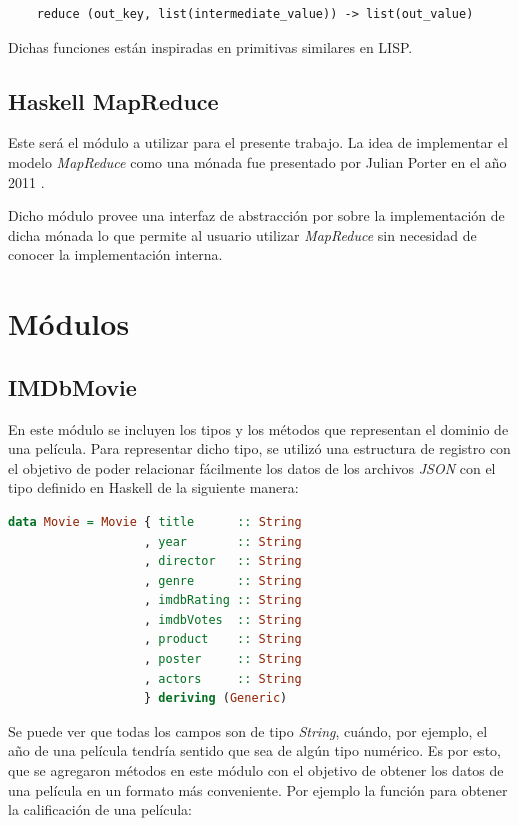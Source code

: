 \documentclass[a4paper,11pt]{article}
\begin{document}
\begin{lstlisting}
	reduce (out_key, list(intermediate_value)) -> list(out_value)
\end{lstlisting}

Dichas funciones están inspiradas en primitivas similares en LISP.

\subsection{Haskell MapReduce}

Este será el módulo a utilizar para el presente trabajo. La idea de implementar el modelo \textit{MapReduce} como una mónada fue presentado por Julian Porter en el año 2011 \cite{porter2011monad}.

Dicho módulo provee una interfaz de abstracción por sobre la implementación de dicha mónada lo que permite al usuario utilizar \textit{MapReduce} sin necesidad de conocer la implementación interna. 
\section{Módulos}

\subsection{IMDbMovie}

En este módulo se incluyen los tipos y los métodos que representan el dominio de una película. Para representar dicho tipo, se utilizó una estructura de registro con el objetivo de poder relacionar fácilmente los datos de los archivos \textit{JSON} con el tipo definido en Haskell de la siguiente manera:

\begin{lstlisting}[language=Haskell,frame=single]
data Movie = Movie { title      :: String
                   , year       :: String
                   , director   :: String
                   , genre      :: String
                   , imdbRating :: String
                   , imdbVotes  :: String
                   , product    :: String
                   , poster     :: String
                   , actors     :: String 
                   } deriving (Generic)
\end{lstlisting}

Se puede ver que todas los campos son de tipo \textit{String}, cuándo, por ejemplo, el año de una película tendría sentido que sea de algún tipo numérico. Es por esto, que se agregaron métodos en este módulo con el objetivo de obtener los datos de una película en un formato más conveniente.
Por ejemplo la función para obtener la calificación de una película:
\end{document}
